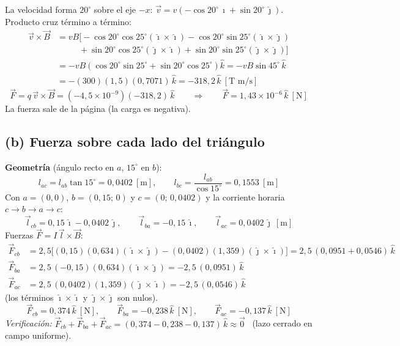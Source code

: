 \documentclass[12pt,letterpaper]{article}
\begin{document}
La velocidad forma $20^\circ$ sobre el eje $-x$:
$\vec{v} = v\left(-\cos20^\circ\,\hat{\imath} + \sin20^\circ\,\hat{\jmath}\right)$. Producto cruz t\'ermino
a t\'ermino:
\begin{align*}
    \vec{v}\times\vec{B} &= vB\bigl[-\cos20^\circ\cos25^\circ(\hat{\imath}\times\hat{\imath})
                            - \cos20^\circ\sin25^\circ(\hat{\imath}\times\hat{\jmath})\\
                         &\qquad\;\; + \sin20^\circ\cos25^\circ(\hat{\jmath}\times\hat{\imath})
                            + \sin20^\circ\sin25^\circ(\hat{\jmath}\times\hat{\jmath})\bigr]\\
                         &= -vB\left(\cos20^\circ\sin25^\circ + \sin20^\circ\cos25^\circ\right)\hat{k}
                          = -vB\sin45^\circ\,\hat{k}\\
                         &= -(300)(1{,}5)(0{,}7071)\,\hat{k} = -318{,}2\,\hat{k}\ [\text{T m/s}]
\end{align*}
\[
    \vec{F} = q\,\vec{v}\times\vec{B} = (-4{,}5\times10^{-9})(-318{,}2)\,\hat{k}
    \qquad\Rightarrow\qquad
    \boxed{\vec{F} = 1{,}43\times10^{-6}\,\hat{k}\ [\text{N}]}
\]
La fuerza sale de la p\'agina (la carga es negativa).

\subsection*{(b) Fuerza sobre cada lado del tri\'angulo}

\textbf{Geometr\'ia} (\'angulo recto en $a$, $15^\circ$ en $b$):
\[
    l_{ac} = l_{ab}\tan15^\circ = 0{,}0402\ [\text{m}],\qquad
    l_{bc} = \frac{l_{ab}}{\cos15^\circ} = 0{,}1553\ [\text{m}]
\]
Con $a=(0,0)$, $b=(0{,}15;\,0)$ y $c=(0;\,0{,}0402)$ y la corriente horaria $c\to b\to a\to c$:
\[
    \vec{l}_{cb} = 0{,}15\,\hat{\imath} - 0{,}0402\,\hat{\jmath},\qquad
    \vec{l}_{ba} = -0{,}15\,\hat{\imath},\qquad
    \vec{l}_{ac} = 0{,}0402\,\hat{\jmath}\ [\text{m}]
\]
Fuerzas $\vec{F} = I\,\vec{l}\times\vec{B}$:
\begin{align*}
    \vec{F}_{cb} &= 2{,}5\bigl[(0{,}15)(0{,}634)(\hat{\imath}\times\hat{\jmath})
                   - (0{,}0402)(1{,}359)(\hat{\jmath}\times\hat{\imath})\bigr]
                  = 2{,}5\,(0{,}0951 + 0{,}0546)\,\hat{k}\\[2pt]
    \vec{F}_{ba} &= 2{,}5\,(-0{,}15)(0{,}634)(\hat{\imath}\times\hat{\jmath})
                  = -2{,}5\,(0{,}0951)\,\hat{k}\\[2pt]
    \vec{F}_{ac} &= 2{,}5\,(0{,}0402)(1{,}359)(\hat{\jmath}\times\hat{\imath})
                  = -2{,}5\,(0{,}0546)\,\hat{k}
\end{align*}
(los t\'erminos $\hat{\imath}\times\hat{\imath}$ y $\hat{\jmath}\times\hat{\jmath}$ son nulos).
\[
    \boxed{\vec{F}_{cb} = 0{,}374\,\hat{k}\ [\text{N}],\qquad
           \vec{F}_{ba} = -0{,}238\,\hat{k}\ [\text{N}],\qquad
           \vec{F}_{ac} = -0{,}137\,\hat{k}\ [\text{N}]}
\]
\noindent\textit{Verificaci\'on:} $\vec{F}_{cb} + \vec{F}_{ba} + \vec{F}_{ac} = (0{,}374 - 0{,}238 - 0{,}137)\,\hat{k}
\approx \vec{0}$ \checkmark\ (lazo cerrado en campo uniforme).
\end{document}
